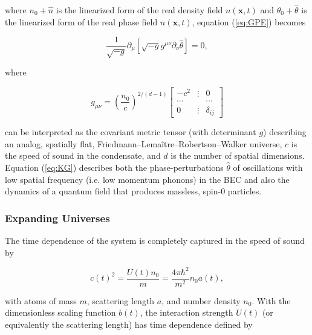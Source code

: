 \documentclass{article}
\begin{document}
            where $n_0 + \hat{n}$ is the linearized form of the real density field $n(\mathbf{x}, t)$ and $\theta_0 + \hat{\theta}$ is the linearized form of the real phase field $n(\mathbf{x}, t)$, equation (\ref{eq:GPE}) becomes\cite{Jain} 

            \begin{equation} \label{eq:KG}
                \frac{1}{\sqrt{-g}} \partial_\mu \left[ \sqrt{-g} g^{\mu \nu} \partial_\nu \hat{\theta} \right] = 0,
            \end{equation}

            where 

            \begin{equation} \label{eq:metric}
                g_{\mu \nu} = \left( \frac{n_0}{c} \right)^{2 / (d - 1)} \begin{bmatrix}
                    -c^2 & \vdots & 0 \\
                    \cdots & & \cdots \\
                    0 & \vdots & \delta_{ij}
                \end{bmatrix}
            \end{equation}

            can be interpreted as the covariant metric tensor (with determinant $g$) describing an analog, spatially flat, Friedmann–Lema{\^i}tre–Robertson–Walker universe, $c$ is the speed of sound in the condensate, and $d$ is the number of spatial dimensions.  Equation (\ref{eq:KG}) describes both the phase-perturbations $\hat{\theta}$ of oscillations with low spatial frequency (i.e. low momentum phonons) in the BEC and also the dynamics of a quantum field that produces massless, spin-0 particles.

        \subsubsection{Expanding Universes}

            The time dependence of the system is completely captured in the speed of sound by 

            \begin{equation} \label{eq:speed}
                c(t)^2 = \frac{U(t) n_0}{m} = \frac{4 \pi \hbar^2}{m^2} n_0 a(t),
            \end{equation}

            with atoms of mass $m$, scattering length $a$, and number density $n_0$.  With the dimensionless scaling function $b(t)$, the interaction strength $U(t)$ (or equivalently the scattering length) has time dependence defined by 
\end{document}
